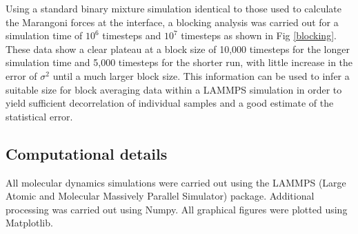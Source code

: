 Using a standard binary mixture simulation identical to those used to calculate the Marangoni forces at the interface, a blocking analysis was carried out for a simulation time of $10^{6}$ timesteps and $10^{7}$ timesteps as shown in Fig \ref{blocking}.
These data show a clear plateau at a block size of 10,000 timesteps for the longer simulation time and 5,000 timesteps for the shorter run, with little increase in the error of $\sigma^{2}$ until a much larger block size.
This information can be used to infer a suitable size for block averaging data within a LAMMPS simulation in order to yield sufficient decorrelation of individual samples and a good estimate of the statistical error. 

\subsection{Computational details}
All molecular dynamics simulations were carried out using the LAMMPS (Large Atomic and Molecular Massively Parallel Simulator) package.\cite{LAMMPS}
Additional processing was carried out using Numpy.\cite{NumPy}
All graphical figures were plotted using Matplotlib.\cite{MatPlotLib}

